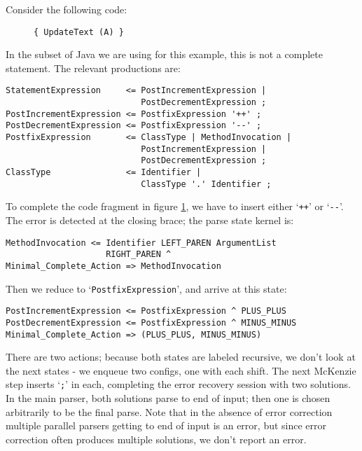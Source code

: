 \documentclass{article}
\newcommand{\code}[1]{`\lstinline|#1|'}
\begin{document}
Consider the following code:
\begin{figure}[H]
\begin{lstlisting}
{ UpdateText (A) }
\end{lstlisting}
\caption{}
\label{ex:minimal_complete_all_recursive}
\end{figure}
In the subset of Java we are using for this example, this is not a
complete statement. The relevant productions are:
\begin{verbatim}
StatementExpression     <= PostIncrementExpression |
                           PostDecrementExpression ;
PostIncrementExpression <= PostfixExpression '++' ;
PostDecrementExpression <= PostfixExpression '--' ;
PostfixExpression       <= ClassType | MethodInvocation |
                           PostIncrementExpression |
                           PostDecrementExpression ;
ClassType               <= Identifier |
                           ClassType '.' Identifier ;
\end{verbatim}
To complete the code fragment in figure
\ref{ex:minimal_complete_all_recursive}, we have to insert either
\code{++} or \code{--}. The error is detected at the closing brace;
the parse state kernel is:
\begin{verbatim}
MethodInvocation <= Identifier LEFT_PAREN ArgumentList
                    RIGHT_PAREN ^
Minimal_Complete_Action => MethodInvocation
\end{verbatim}
Then we reduce to \code{PostfixExpression}, and arrive at this state:
\begin{verbatim}
PostIncrementExpression <= PostfixExpression ^ PLUS_PLUS
PostDecrementExpression <= PostfixExpression ^ MINUS_MINUS
Minimal_Complete_Action => (PLUS_PLUS, MINUS_MINUS)
\end{verbatim}
There are two actions; because both states are labeled recursive, we
don't look at the next states - we enqueue two configs, one with each
shift. The next McKenzie step inserts \code{;} in each, completing the
error recovery session with two solutions. In the main parser, both
solutions parse to end of input; then one is chosen arbitrarily to be
the final parse. Note that in the absence of error correction multiple
parallel parsers getting to end of input is an error, but since error
correction often produces multiple solutions, we don't report an
error.
\end{document}
